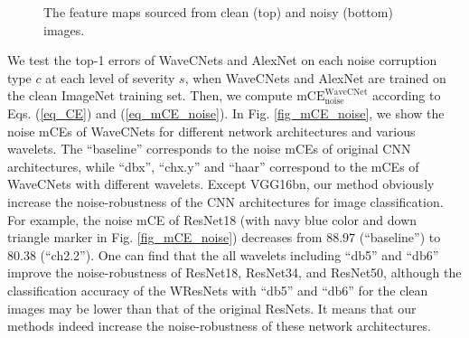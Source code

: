 \documentclass[10pt,twocolumn,letterpaper]{article}
\begin{document}
\begin{figure}[bpt]
	\centering
	\hspace{30pt}
	\caption{The feature maps sourced from clean (top) and noisy (bottom) images.}
	\label{fig_feature_map_noise}
\end{figure}
We test the top-1 errors of WaveCNets and AlexNet on each noise corruption type $c$ at each level of severity $s$,
when WaveCNets and AlexNet are trained on the clean ImageNet training set.
Then, we compute $\text{mCE}_{\text{noise}}^{\text{WaveCNet}}$ according to Eqs. (\ref{eq_CE}) and (\ref{eq_mCE_noise}).
In Fig. \ref{fig_mCE_noise}, we show the noise mCEs of WaveCNets for different network architectures and various wavelets.
The ``baseline'' corresponds to the noise mCEs of original CNN architectures,
while ``dbx'', ``chx.y'' and ``haar'' correspond to the mCEs of WaveCNets with different wavelets.
Except VGG16bn, our method obviously increase the noise-robustness of the CNN architectures for image classification.
For example, the noise mCE of ResNet18 (with navy blue color and down triangle marker in Fig. \ref{fig_mCE_noise})
decreases from $88.97$ (``baseline'') to $80.38$ (``ch2.2'').
One can find that the all wavelets including ``db5'' and ``db6'' improve the noise-robustness of ResNet18, ResNet34, and ResNet50,
although the classification accuracy of the WResNets with ``db5'' and ``db6'' for the clean images may be lower than that of the original ResNets.
It means that our methods indeed increase the noise-robustness of these network architectures.
\end{document}
